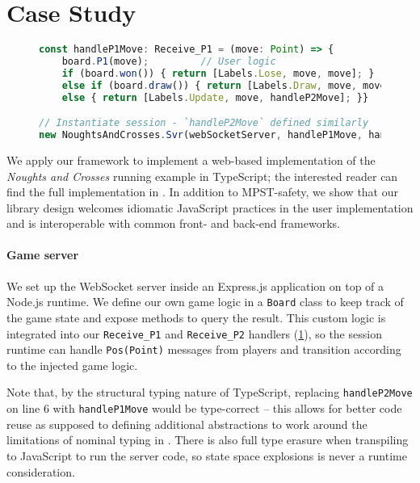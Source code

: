 \section{Case Study}
\label{section:example}

\begin{figure}
\begin{lstlisting}[language=JavaScript, tabsize=4]
const handleP1Move: Receive_P1 = (move: Point) => {
	board.P1(move);			// User logic
	if (board.won()) { return [Labels.Lose, move, move]; }
	else if (board.draw()) { return [Labels.Draw, move, move]; }
	else { return [Labels.Update, move, handleP2Move]; }}

// Instantiate session - `handleP2Move` defined similarly
new NoughtsAndCrosses.Svr(webSocketServer, handleP1Move, handleP2Move);
\end{lstlisting}
\label{lst:svrprotocol}
\end{figure}

We apply our framework to implement a web-based implementation of the
\textit{Noughts and Crosses} running example in TypeScript;
the interested reader can find the full implementation in
\cite{NoughtsAndCrosses}.
In addition to MPST-safety, we show that our library design welcomes idiomatic
JavaScript practices in the user implementation and is interoperable with
common front- and back-end frameworks.

\paragraph{Game server}
We set up the WebSocket server inside an Express.js \cite{ExpressJS}
application on top of a Node.js \cite{NodeJS} runtime.
We define our own game logic in a \texttt{Board} class to keep track of the
game state and expose methods to query the result.
This custom logic is integrated into our \texttt{Receive\_P1} and
\texttt{Receive\_P2} handlers (\cref{lst:svrprotocol}), so the session runtime
can handle \texttt{Pos(Point)} messages from players and transition according
to the injected game logic.

Note that, by the structural typing nature of TypeScript, replacing
\texttt{handleP2Move} on line 6 with \texttt{handleP1Move} would be
type-correct -- this allows for better code reuse as supposed to defining
additional abstractions to work around the limitations of nominal typing in
\cite{Hybrid2016}.
There is also full type erasure when transpiling to JavaScript to run the
server code, so state space explosions is never a runtime consideration.


